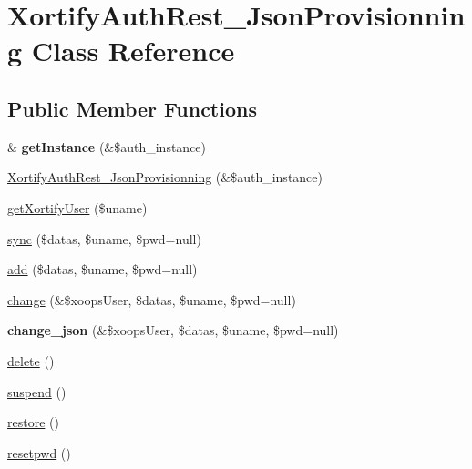 \hypertarget{class_xortify_auth_rest___json_provisionning}{\section{Xortify\-Auth\-Rest\-\_\-\-Json\-Provisionning Class Reference}
\label{class_xortify_auth_rest___json_provisionning}
}
\subsection*{Public Member Functions}
\begin{DoxyCompactItemize}
\item 
\hypertarget{class_xortify_auth_rest___json_provisionning_a26700416750a0683862db732104186c8}{\& {\bfseries get\-Instance} (\&\$auth\-\_\-instance)}\label{class_xortify_auth_rest___json_provisionning_a26700416750a0683862db732104186c8}

\item 
\hyperlink{class_xortify_auth_rest___json_provisionning_a0af174eb2d46329be55449780606141c}{Xortify\-Auth\-Rest\-\_\-\-Json\-Provisionning} (\&\$auth\-\_\-instance)
\item 
\hyperlink{class_xortify_auth_rest___json_provisionning_a5c49c50f97e7fa27e7b4543a591c46c4}{get\-Xortify\-User} (\$uname)
\item 
\hyperlink{class_xortify_auth_rest___json_provisionning_a198d7111f7ae3c97308e50dad2388274}{sync} (\$datas, \$uname, \$pwd=null)
\item 
\hyperlink{class_xortify_auth_rest___json_provisionning_aa06a2d79175e98e3949585e9acde2b74}{add} (\$datas, \$uname, \$pwd=null)
\item 
\hyperlink{class_xortify_auth_rest___json_provisionning_a08793efb98fa4e49c4ad1eeccd159bde}{change} (\&\$xoops\-User, \$datas, \$uname, \$pwd=null)
\item 
\hypertarget{class_xortify_auth_rest___json_provisionning_a2f4273f75c3c2ecad30cb474ca00453c}{{\bfseries change\-\_\-json} (\&\$xoops\-User, \$datas, \$uname, \$pwd=null)}\label{class_xortify_auth_rest___json_provisionning_a2f4273f75c3c2ecad30cb474ca00453c}

\item 
\hyperlink{class_xortify_auth_rest___json_provisionning_a36e2172bae79c2db9378e849426408f7}{delete} ()
\item 
\hyperlink{class_xortify_auth_rest___json_provisionning_a0f377abd3a9ae99e246662820b2d8c94}{suspend} ()
\item 
\hyperlink{class_xortify_auth_rest___json_provisionning_a0353b21ea5a0a728eb10b049798688d1}{restore} ()
\item 
\hyperlink{class_xortify_auth_rest___json_provisionning_af08fd612ef4c1aa5f390f04a2fe69549}{resetpwd} ()
\end{DoxyCompactItemize}

